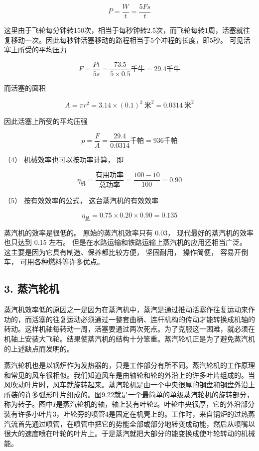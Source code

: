 \[
P = \frac {W}{t} = \frac {5 F s}{t}
\]

这里由于飞轮每分钟转150次，相当于每秒钟转2.5次，而飞轮每转1周，活塞就往复移动一次。因此每秒钟活塞移动的路程相当于5个冲程的长度，即5秒。
可见活塞上所受的平均压力

\[
F = \frac {P t}{5 s} = \frac {73.5}{5 \times 0.5} \text{千牛} = 29.4 \text{千牛}
\]

而活塞的面积

\[
A=\pi r^2=3.14\times(0.1)^2\ \text{米}^2=0.0314\ \text{米}^2
\]

因此活塞上所受的平均压强

\[
p = \frac {F}{A} = \frac {29.4}{0.0314} \text{千帕} = 936 \text{千帕}
\]

（4） 机械效率也可以按功率计算， 即

\[
\eta_ {\text{机}} = \frac {\text{有用功率}}{\text{总功率}} = \frac {100 - 10}{100} = 0.90
\]

（5） 按有效效率的公式， 这台蒸汽机的有效效率

\[
\eta_ {\text{总}} = 0.75 \times 0.20 \times 0.90 = 0.135
\]

蒸汽机的效率是很低的。 原始的蒸汽机效率只有 0.03，
现代最好的蒸汽机的效率也只达到 0.15 左右。
但是在水路运输和铁路运输上蒸汽机的应用还相当广泛。
这主要是因为它具有制造、保养都比较方便， 坚固耐用， 操作简便，
容易开倒车， 可用各种燃料等许多优点。

\subsection{3. 蒸汽轮机}\label{ux84b8ux6c7dux8f6eux673a}

蒸汽机效率低的原因之一是因为在蒸汽机中，蒸汽是通过推动活塞作往复运动来作功的，而活塞的往复运动必须通过一整套曲柄、连杆机构的传动才能转换成机轴的转动。这样机轴每转动一周，活塞要通过两次死点。为了克服这一困难，就必须在机轴上安装大飞轮。结果使蒸汽机的结构十分笨重。蒸汽轮机正是为了避免蒸汽机的上述缺点而发明的。

蒸汽轮机也是以锅炉作为发热器的，只是工作部分有所不同。蒸汽轮机的工作原理和常见的风车很相似。我们知道风车是由轴轮和轮的外沿上的许多叶片组成的。当风吹动叶片时，风车就旋转起来。蒸汽轮机是由一个中央很厚的钢盘和钢盘外沿上所装的许多弧形叶片组成的。图9.22就是一个最简单的单级蒸汽轮机的旋转部分，称为转子。图中\(I\)是蒸汽轮机的轴，轴上装有叶轮2。叶轮中央很厚，它的外沿部分装有许多小叶片3，叶轮旁的喷管4是固定在机壳上的。工作时，来自锅炉的过热蒸汽流首先通过喷管，在喷管中把它的势能全部或部分地转变成动能，然后从喷嘴以很大的速度喷在叶轮的叶片上。于是蒸汽就把大部分的能变换成使叶轮转动的机械能。

